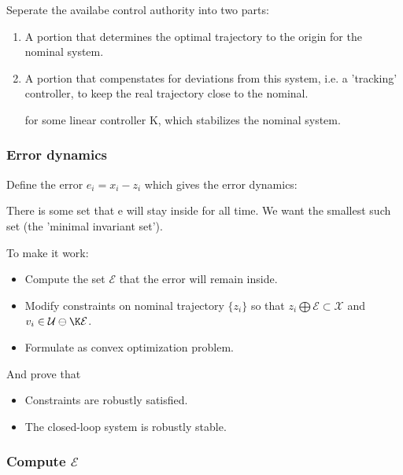 \documentclass[8pt,a4paper]{scrartcl}
\begin{document}
\begin{multicols*}{3}
Seperate the availabe control authority into two parts:

\begin{enumerate}
\ncompaq
\item A portion that determines the optimal trajectory to the origin for the nominal system.
\item A portion that compenstates for deviations from this system, i.e. a 'tracking' controller, to keep the real trajectory close to the nominal.


for some linear controller K, which stabilizes the nominal system.
\end{enumerate}

\subsubsection{Error dynamics}

Define the error $e_i=x_i-z_i$ which gives the error dynamics:


There is some set that e will stay inside for all time. We want the smallest such set (the 'minimal invariant set').


To make it work:

\begin{itemize}
\ncompaq
\item Compute the set $\mathcal{E}$ that the error will remain inside.
\item Modify constraints on nominal trajectory $\{z_i\}$ so that $z_i\bigoplus\mathcal{E}\subset\mathcal{X}$ and $v_i\in\mathcal{U}\ominus\K\mathcal{E}$.
\item Formulate as convex optimization problem.
\end{itemize}

And prove that
\begin{itemize}
\ncompaq
\item Constraints are robustly satisfied.
\item The closed-loop system is robustly stable.
\end{itemize}

\subsubsection{Compute $\mathcal{E}$}


\end{multicols*}
\end{document}
